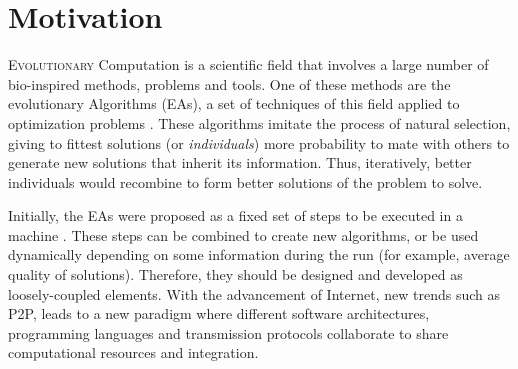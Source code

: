 \section{Motivation}
\label{sec:intro:eas}


\lettrine{E}{volutionary} Computation is a scientific field that
involves a large number of bio-inspired methods, problems and
tools. One of these methods are the evolutionary Algorithms (EAs), a set
of techniques of this field applied to optimization problems
\cite{eiben2010whatis}. These algorithms imitate the process of
natural selection, giving to fittest solutions (or {\em individuals})
more probability to mate with others to generate new solutions that
inherit its information. Thus, iteratively, better individuals would
recombine to form better solutions of the problem to solve. %

Initially, the EAs were proposed as a fixed set of steps to be
executed in a machine \cite{eiben2010whatis}. %
These steps can be combined to create new algorithms, or be used %
dynamically  depending on some information during the run (for
example, average quality of solutions). Therefore, they should be
designed and developed as loosely-coupled elements. With the advancement
of Internet, new trends such as P2P, leads to a new paradigm where
different software architectures, programming languages and
transmission protocols collaborate to share computational resources
and integration.  


